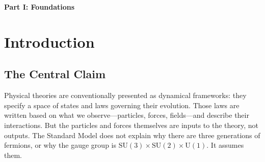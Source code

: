 \documentclass[11pt]{article}
\newcommand{\SU}{\mathrm{SU}}
\newcommand{\U}{\mathrm{U}}
\begin{document}
\begin{abstract}
The framework makes contact with reality at three distinct layers: (I)~structural necessities forced by the axiom (Hilbert space, gauge symmetry, $d{=}4$ spacetime); (II)~exact rational predictions from capacity counting ($\sin^2\!\theta_W = 3/13$, $\Omega_\Lambda = 42/61$, $f_b = 3/19$, $\Lambda\cdot G = 3\pi/102^{61}$); and (III)~model-dependent estimates using framework-derived inputs ($n_s$, $\eta_B$, BBN abundances).  We present the full observational concordance---12 predictions, 0 free parameters---with honest epistemic stratification and explicit identification of tensions and attack surfaces.

The derivation chain is: one axiom produces four lemmas (locality, non-closure, irreversibility, minimality), which produce 129 machine-verifiable theorems across 8 physics modules, which produce 25 quantitative predictions (including cosmological densities, the Weinberg angle, all three PMNS neutrino mixing angles, all CKM quark mixing parameters, and six fermion mass ratios), 6 qualitative predictions, and 11 principles normally assumed as axioms---all from zero free parameters (Appendix~F).  The APF codebase (827 assertions, all passing, zero empirical imports in the derivation chain) serves as the authoritative specification: every claim in this paper can be checked against running code.
\end{abstract}

\tableofcontents
\newpage


{\centering\Large\bfseries Part I: Foundations\par}
\vspace{8pt}

\section{Introduction}

\subsection{The Central Claim}

Physical theories are conventionally presented as dynamical frameworks: they specify a space of states and laws governing their evolution.  Those laws are written based on what we observe---particles, forces, fields---and describe their interactions.  But the particles and forces themselves are inputs to the theory, not outputs.  The Standard Model does not explain why there are three generations of fermions, or why the gauge group is $\SU(3)\times\SU(2)\times\U(1)$.  It assumes them.
\end{document}
